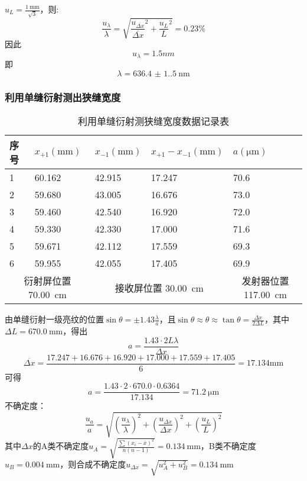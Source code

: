 \documentclass[]{../template/Report}%
\begin{document}
\begin{fullreportonly}
$u_L = \frac{\SI{1}{\milli \meter}}{\sqrt{3}}$，则:
\[
\frac{u_\lambda}{\lambda} = \sqrt{\frac{u_{\bar{\Delta x}}}{\bar{\Delta x}}^2 + \frac{u_L}{L}^2} = 0.23\%
\]
因此
\[
u_\lambda = 1.5nm
\]
即
\[
\lambda = \SI{636.4(1.5)}{\nano\meter}
\]
\subsubsection{利用单缝衍射测出狭缝宽度}
\begin{table}[H]
\centering
\caption{利用单缝衍射测狭缝宽度数据记录表}
\label{tab:a}
\begin{tabular}{|ll|ll|l|}
\hline
\multicolumn{1}{|l|}{序号} & $x_{+1}(\si{\mm})$ & \multicolumn{1}{l|}{$x_{-1}(\si{\mm})$} & $x_{+1} - x_{-1}(\si{\mm})$ & $a(\si{\micro \meter})$                    \\ \hline
\multicolumn{1}{|l|}{1} & 60.162 & \multicolumn{1}{l|}{42.915} & 17.247 & 70.6 \\ \hline
\multicolumn{1}{|l|}{2} & 59.680 & \multicolumn{1}{l|}{43.005} & 16.676 & 73.0 \\ \hline
\multicolumn{1}{|l|}{3} & 59.460 & \multicolumn{1}{l|}{42.540} & 16.920 & 72.0 \\ \hline
\multicolumn{1}{|l|}{4} & 59.330 & \multicolumn{1}{l|}{42.330} & 17.000 & 71.6 \\ \hline
\multicolumn{1}{|l|}{5} & 59.671 & \multicolumn{1}{l|}{42.112} & 17.559 & 69.3 \\ \hline
\multicolumn{1}{|l|}{6} & 59.955 & \multicolumn{1}{l|}{42.055} & 17.405 & 69.9 \\ \hline
\multicolumn{2}{|c|}{衍射屏位置 \SI{70.00}{\cm}}   & \multicolumn{2}{c|}{接收屏位置 \SI{30.00}{\cm}}                            & \multicolumn{1}{c|}{发射器位置\SI{117.00}{\cm}} \\ \hline
\end{tabular}%
\end{table}
由单缝衍射一级亮纹的位置$\sin \theta = \pm 1.43 \frac{\lambda}{a}$，且$\sin \theta \approx \theta \approx \tan \theta = \frac{\Delta x}{2\Delta L}$，其中$\Delta L = \SI{670.0}{\mm}$，得出
\[
a = \frac{1.43 \cdot 2L\lambda}{\Delta x}
\]
\[
\overline{\Delta x} = \frac{17.247 + 16.676 + 16.920 + 17.000 + 17.559 + 17.405}{6} = 17.134 \si{\mm}
\]
可得
\[a = \frac{1.43 \cdot 2 \cdot 670.0 \cdot 0.6364}{17.134} = \SI{71.2}{\micro \meter}\]
不确定度：
\[
\frac{u_a}{a} = \sqrt{\left(\frac{u_\lambda}{\lambda}\right)^2 + \left(\frac{u_{\Delta x}}{\Delta x}\right)^2 + \left(\frac{u_{L}}{L}\right)^2}
\]
其中$\Delta x$的A类不确定度$u_A = \sqrt{\frac{\sum{(x_i - \bar{x})^2}}{n(n-1)}} = \SI{0.134}{\mm}$，B类不确定度$u_B = \SI{0.004}{\mm}$，则合成不确定度$u_{\Delta x} = \sqrt{u_A^2 + u_B^2} = \SI{0.134}{\mm}$


\end{fullreportonly}
\end{document}
